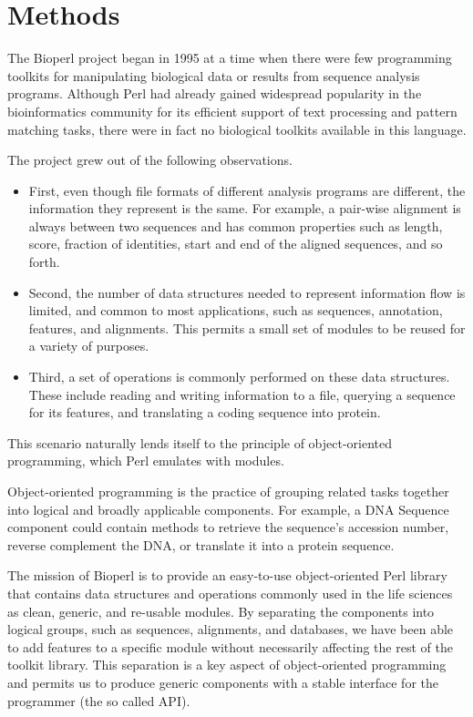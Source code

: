 \documentclass[12pt]{article}
\begin{document}
\section{Methods}

The Bioperl project began in 1995 \cite{chervitz-bits} at a time when
there were few programming toolkits for manipulating biological data
or results from sequence analysis programs.  Although Perl had already
gained widespread popularity in the bioinformatics community for its
efficient support of text processing and pattern matching tasks, there
were in fact no biological toolkits available in this language.

The project grew out of the following observations.  
\begin{itemize}

\item First, even though file formats of different analysis programs
are different, the information they represent is the same.  For
example, a pair-wise alignment is always between two sequences and has
common properties such as length, score, fraction of identities, start
and end of the aligned sequences, and so forth.

\item Second, the number of data structures needed to represent
information flow is limited, and common to most applications, such as
sequences, annotation, features, and alignments.  This permits a 
small set of modules to be reused for a variety of purposes.

\item Third, a set of operations is commonly performed on these data
structures.  These include reading and writing information to a file,
querying a sequence for its features, and translating a coding
sequence into protein.

\end{itemize}

This scenario naturally lends itself to the principle of
object-oriented programming, which Perl emulates with modules.

Object-oriented programming is the practice of grouping related tasks
together into logical and broadly applicable components.  For example,
a DNA Sequence component could contain methods to retrieve the
sequence's accession number, reverse complement the DNA, or translate
it into a protein sequence.

The mission of Bioperl is to provide an easy-to-use object-oriented
Perl library that contains data structures and operations commonly
used in the life sciences as clean, generic, and re-usable modules.
By separating the components into logical groups, such as sequences,
alignments, and databases, we have been able to add features to a
specific module without necessarily affecting the rest of the toolkit
library.  This separation is a key aspect of object-oriented
programming and permits us to produce generic components with a stable
interface for the programmer (the so called API).  
\end{document}
